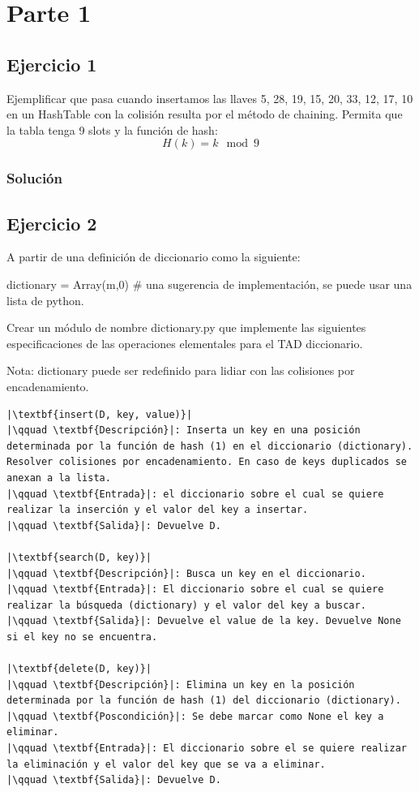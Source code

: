 \documentclass{article}
\begin{document}


\section*{Parte 1}
\subsection*{Ejercicio 1}
Ejemplificar que pasa cuando insertamos las llaves 5, 28, 19, 15, 20, 33, 12, 17, 10 en un HashTable con la colisión resulta por el método de chaining. Permita que la tabla tenga 9 slots y la función de hash:
\begin{equation}
    H(k) = k \mod 9
\end{equation}
\subsubsection*{Solución}


\subsection*{Ejercicio 2}
A partir de una definición de diccionario como la siguiente:

dictionary = Array(m,0) \# una sugerencia de implementación, se puede usar una lista de python.

Crear un módulo de nombre dictionary.py que implemente las siguientes especificaciones de las operaciones elementales para el TAD diccionario.

Nota: dictionary puede ser redefinido para lidiar con las colisiones por encadenamiento.

\begin{lstlisting}
|\textbf{insert(D, key, value)}|
|\qquad \textbf{Descripción}|: Inserta un key en una posición determinada por la función de hash (1) en el diccionario (dictionary). Resolver colisiones por encadenamiento. En caso de keys duplicados se anexan a la lista.
|\qquad \textbf{Entrada}|: el diccionario sobre el cual se quiere realizar la inserción y el valor del key a insertar.        
|\qquad \textbf{Salida}|: Devuelve D.

|\textbf{search(D, key)}|
|\qquad \textbf{Descripción}|: Busca un key en el diccionario.
|\qquad \textbf{Entrada}|: El diccionario sobre el cual se quiere realizar la búsqueda (dictionary) y el valor del key a buscar.
|\qquad \textbf{Salida}|: Devuelve el value de la key. Devuelve None si el key no se encuentra.        

|\textbf{delete(D, key)}|
|\qquad \textbf{Descripción}|: Elimina un key en la posición determinada por la función de hash (1) del diccionario (dictionary).
|\qquad \textbf{Poscondición}|: Se debe marcar como None el key a eliminar.
|\qquad \textbf{Entrada}|: El diccionario sobre el se quiere realizar la eliminación y el valor del key que se va a eliminar.
|\qquad \textbf{Salida}|: Devuelve D.
\end{lstlisting}
\end{document}
